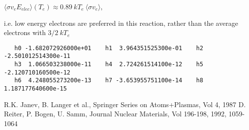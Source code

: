 $\langle\sigma v_e E_{elec}\rangle(T_e) \approx 0.89 ~kT_e ~\langle\sigma v_e\rangle$,

i.e. low energy electrons are preferred in this reaction, rather than the average electrons with $3/2~kT_e$


\begin{small}\begin{verbatim}
   h0 -1.682072926000e+01    h1  3.964351525300e-01    h2 -2.501012514300e-11
   h3  1.066503238000e-11    h4  2.724261514100e-12    h5 -2.120710160500e-12
   h6  4.248055273200e-13    h7 -3.653955751100e-14    h8  1.187177640600e-15

\end{verbatim}\end{small}
\newpage
\begin{thebibliography}{99}
 R.K. Janev, B. Langer et al.,  Springer Series on Atoms+Plasmas,
                   Vol 4, 1987
 D. Reiter, P. Bogen, U. Samm, Journal Nuclear Materials, Vol 196-198, 1992, 1059-1064
\end{thebibliography}

